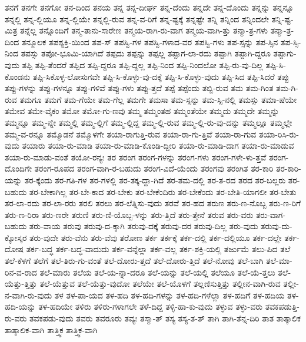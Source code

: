 {ತನಗೆ
ತನಗೇ
ತನಗೋ
ತನ-ದಿಂದ
ತನಯ
ತನ್ನ
ತನ್ನ-ದೀರ್ಘ
ತನ್ನ-ದೆಂದು
ತನ್ನದೇ
ತನ್ನ-ದೊಂದು
ತನ್ನನ್ನು
ತನ್ನನ್ನೂ
ತನ್ನಲ್ಲಿ
ತನ್ನ-ಲ್ಲಿಯೂ
ತನ್ನ-ಲ್ಲಿಯೇ
ತನ್ನಲ್ಲಿ-ರುವ
ತನ್ನ-ವ-ರಿಗೆ
ತನ್ನ-ಷ್ಟಕ್ಕೆ
ತನ್ನಷ್ಟೇ
ತನ್ನಿ
ತನ್ನಿಂದ
ತನ್ನಿಂದಲೇ
ತನ್ನಿ-ಷ್ಟ-ಮಿತ್ರ
ತನ್ನೆಲ್ಲ
ತನ್ನೊಂದಿಗೆ
ತನ್ಮ-ತಾನು-ಸಾರೇಣ
ತನ್ಮಯ-ರಾಗಿ-ರು-ವಾಗ
ತನ್ಮಯ-ವಾಗಿ-ತ್ತು
ತನ್ಮಾ-ತ್ರ-ಗಳು
ತನ್ಮಾ-ತ್ರ-ದಿಂದ
ತನ್ಮೂಲಕ
ತಪಶ್ಯಕ್ತಿ-ಯಿಂದ
ತಪ-ಸ್
ತಪಸ್ವಿ-ಗಳ
ತಪಸ್ವಿ-ಗಳಾದ-ವರ
ತಪಸ್ವಿ-ಗಳು
ತಪ-ಸ್ಸನ್ನು
ತಪ-ಸ್ಸಿನ
ತಪ-ಸ್ಸಿ-ನಿಂದ
ತಪಸ್ಸು
ತಪೋ-ಭೂಮಿ-ಯಾಗಿದೆ
ತಪ್ಪದು
ತಪ್ಪನ್ನು
ತಪ್ಪಲ್ಲ
ತಪ್ಪಾಗ-ಲಾ-ರದು
ತಪ್ಪಾಗಿ
ತಪ್ಪಾಗಿ-ದ್ದರೂ
ತಪ್ಪಾಗು-ವುದು
ತಪ್ಪಿ
ತಪ್ಪಿ-ತೆಂದರೆ
ತಪ್ಪಿದ
ತಪ್ಪಿ-ದ್ದರೂ
ತಪ್ಪಿ-ದ್ದಲ್ಲ
ತಪ್ಪಿ-ನಿಂದ
ತಪ್ಪಿ-ನಿಂದಲೋ
ತಪ್ಪಿ-ರು-ವು-ದಿಲ್ಲ
ತಪ್ಪಿ-ಸಿ-ಕೊಂಡನು
ತಪ್ಪಿ-ಸಿಕೊಳ್ಳ-ಲೋಸುಗವೇ
ತಪ್ಪಿ-ಸಿ-ಕೊಳ್ಳು-ವು-ದಕ್ಕೆ
ತಪ್ಪಿ-ಸಿ-ಕೊಳ್ಳು-ವುದು
ತಪ್ಪಿ-ಸಿದ
ತಪ್ಪಿ-ಸಿದರೆ
ತಪ್ಪು
ತಪ್ಪು-ಗಳನ್ನು
ತಪ್ಪು-ಗಳನ್ನೂ
ತಪ್ಪು-ಗಳಿವೆ
ತಪ್ಪು-ಗಳು
ತಪ್ಪು-ತ್ತದೆ
ತಪ್ಪೆ
ತಪ್ಪೆಂದು
ತಬ್ಬಿ-ರುವ
ತಮ
ತಮ-ಗಿಂತ
ತಮ-ಗಿ-ರುವ
ತಮಗೂ
ತಮಗೆ
ತಮ-ಗೆಯೇ
ತಮ-ಗೆಲ್ಲ
ತಮಗೇ
ತಮಸಾ
ತಮ-ಸ್ಸನ್ನು
ತಮ-ಸ್ಸಿ-ನಲ್ಲಿ
ತಮಸ್ಸು
ತಮಾ-ಷೆಯೇ
ತಮೇವ
ತಮೇ-ವೈಕಂ
ತಮೋ
ತಮೋ-ಗು-ಣವು
ತಮ್ಮ
ತಮ್ಮಂತಹ
ತಮ್ಮಂತೆಯೇ
ತಮ್ಮದು
ತಮ್ಮದೇ
ತಮ್ಮನ್ನು
ತಮ್ಮನ್ನೂ
ತಮ್ಮ-ನ್ನೇ
ತಮ್ಮಲ್ಲಿ
ತಮ್ಮ-ಲ್ಲಿಗೆ
ತಮ್ಮ-ಲ್ಲಿದ್ದ
ತಮ್ಮ-ಲ್ಲಿ-ರುವ
ತಮ್ಮ-ಲ್ಲಿ-ರು-ವು-ದನ್ನು
ತಮ್ಮಲ್ಲೂ
ತಮ್ಮಲ್ಲೇ
ತಮ್ಮ-ವ-ರನ್ನೂ
ತಮ್ಮೊಡನೆ
ತಮ್ಮೊಳಗೇ
ತಯಾ-ರಾಗುತ್ತಿ-ರುವ
ತಯಾ-ರಾ-ಗು-ತ್ತಿವೆ
ತಯಾ-ರಾ-ಗುವ
ತಯಾ-ರಿಸಿ-ರು-ವುದು
ತಯಾರು
ತಯಾ-ರು-ಮಾಡಿ
ತಯಾ-ರು-ಮಾಡಿ-ಕೊಂಡಿ-ದ್ದೀರಿ
ತಯಾ-ರು-ಮಾಡಿ-ದಾಗ
ತಯಾ-ರು-ಮಾಡುವ
ತಯಾ-ರು-ಮಾಡು-ವಂತೆ
ತಯೋ-ರನ್ಯಃ
ತರ
ತರಂಗ
ತರಂಗ-ಗಳನ್ನು
ತರಂಗ-ಗಳು
ತರಂಗ-ಗಳೇ-ಳು-ತ್ತವೆ
ತರಂಗ-ದೊಂದಿಗೇ
ತರಂಗ-ರೂಪದ
ತರಂಗ-ವಾಗಿ-ರ-ಬಹುದು
ತರಂಗ-ವಿದೆ-ಯೆಂದು
ತರಂಗವು
ತರಂಗಿತ
ತರ-ಕಾರಿ
ತರ-ಕಾರಿ-ಯನ್ನು
ತರ-ಕ್ಕೆಂದು
ತರ-ಗತಿ-ಗಳ
ತರ-ಗಳಲ್ಲಿ
ತರ-ತಕ್ಕ-ದ್ದಾ-ಗಿದೆ
ತರ-ತಮ-ದಲ್ಲಿ
ತರ-ತ-ರದ
ತರದ
ತರ-ಬಲ್ಲರು
ತರ-ಬಹುದು
ತರ-ಬೇಕಾಗಿಲ್ಲ
ತರ-ಬೇ-ಕಾದ
ತರ-ಬೇಕು
ತರ-ಬೇಕೆಂದಿರು
ತರ-ಬೇಕೆಂದು
ತರ-ಬೇತಿ-ಯಾಗಲೀ
ತರ-ಬೇತು
ತರ-ಲಾ-ರದು
ತರ-ಲಾ-ರರು
ತರಲಿ
ತರಲು
ತರ-ಲೆತ್ನಿಸು-ವುದು
ತರವೆ
ತರ-ಹದ
ತರುಣ
ತರು-ಣ-ನೊಬ್ಬ
ತರು-ಣ-ರಿಗೆ
ತರು-ಣ-ರಿರಾ
ತರು-ಣರೇ
ತರುಣಿ
ತರು-ಣಿ-ಯೊಬ್ಬ-ಳನ್ನು
ತರು-ತ್ತಿದೆ
ತರು-ತ್ತೇನೆ
ತರುವ
ತರು-ವರು
ತರು-ವಾಗ-ಬಹುದು
ತರು-ವಾಯ
ತರುವು
ತರುವು-ದ-ಕ್ಕಾಗಿ
ತರುವು-ದಕ್ಕೆ
ತರುವು-ದರ
ತರುವು-ದಿಲ್ಲ
ತರು-ವುದು
ತರುವು-ದು-ಕ್ಕೋಸ್ಕರ
ತರು-ವುದೇ
ತರು-ವೆನು
ತರು-ವೆವು
ತರೋಣ
ತರ್ಕ
ತರ್ಕಕ್ಕೆ
ತರ್ಕ-ದಲ್ಲಿ
ತರ್ಕ-ದಲ್ಲಿಯೂ
ತರ್ಕ-ದಲ್ಲೇ
ತರ್ಕ-ದೋಷ
ತರ್ಕ-ಬದ್ಧ
ತರ್ಕ-ಬದ್ಧ-ವಾದುದು
ತರ್ಕ-ವನ್ನೆಲ್ಲಾ
ತರ್ಕ-ವಲ್ಲ
ತರ್ಕ-ಶಕ್ತಿ-ಯಲ್ಲಿ
ತರ್ಜುಮೆ
ತಲು-ಪಿದ
ತಲೆ
ತಲೆ-ಕೆಳಗೆ
ತಲೆಗೆ
ತಲೆ-ತಿರು-ಗು-ವಂತೆ
ತಲೆ-ದೋರು-ತ್ತದೆ
ತಲೆ-ದೋರು-ತ್ತಿದೆ
ತಲೆ-ನೋವು
ತಲೆ-ಬಾಗಿ
ತಲೆ-ಮಾ-ರಿನ-ವ-ರಾದ
ತಲೆ-ಮಾರು
ತಲೆಯ
ತಲೆ-ಯ-ನ್ನಾ-ದರೂ
ತಲೆ-ಯನ್ನು
ತಲೆ-ಯಲ್ಲಿ
ತಲೆಯೂ
ತಲೆ-ಯೆ-ತ್ತಲು
ತಲೆ-ಯೆತ್ತು-ತ್ತಿತ್ತು
ತಲೆ-ಯೆತ್ತುವ
ತಲೆ-ಯೆತ್ತು-ವುದೋ
ತಲೆಯೇ
ತಲೆ-ಯೊಳಗೆ
ತಲ್ಲಣಿಸುತ್ತಿತ್ತು
ತಲ್ಲೀನ-ವಾಗಿ-ರುವ
ತಲ್ಲೀ-ನ-ವಾಗಿ-ರು-ವುದು
ತಳ
ತಳ-ಪಾ-ಯದ
ತಳ-ಹದಿ
ತಳ-ಹದಿ-ಗಳನ್ನು
ತಳ-ಹದಿ-ಗಳೆಲ್ಲಾ
ತಳ-ಹದಿಗೆ
ತಳ-ಹದಿಯ
ತಳ-ಹದಿ-ಯನ್ನು
ತಳ-ಹದಿಯೇ
ತಳಿರು
ತಳಿರು-ಗಳಾಗಲೇ
ತಳೆ-ದಿದ್ದ
ತಳ್ಳಿ-ಹಾ-ಕು-ವುದು
ತಳ್ಳುವ
ತಳ್ಳು-ವರು
ತವಕಪಡುತ್ತಿ-ರು-ವರು
ತವಕಪಡು-ವುದು
ತವರು
ತವರೂರು
ತವ್ಯಃ
ತಸ್ಮಾ-ತ್
ತಸ್ಯ
ತಸ್ಯ-ತ-ತ್
ತಾಗಿ
ತಾಗಿ-ತೆನ್ನ-ದಿರಿ
ತಾತ
ತಾತ್ಕಾಲಿಕ
ತಾತ್ಕಾಲಿಕ-ವಾಗಿ
ತಾತ್ತ್ವಿಕ
ತಾತ್ತ್ವಿಕ-ವಾಗಿ
}
